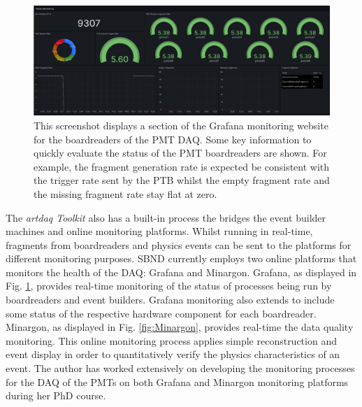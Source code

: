 \begin{figure}[htbp!] 
\centering    
\includegraphics[width=1.0\textwidth]{Grafana}
\caption[Grafana]{
This screenshot displays a section of the Grafana monitoring website for the boardreaders of the PMT DAQ.
Some key information to quickly evaluate the status of the PMT boardreaders are shown.
For example, the fragment generation rate is expected be consistent with the trigger rate sent by the PTB whilst the empty fragment rate and the missing fragment rate stay flat at zero.
}
\label{fig:Grafana}
 \end{figure}

The \textit{artdaq Toolkit} also has a built-in process the bridges the event builder machines and online monitoring platforms.
Whilst running in real-time, fragments from boardreaders and physics events can be sent to the platforms for different monitoring purposes.
SBND currently employs two online platforms that monitors the health of the DAQ: Grafana and Minargon.
Grafana, as displayed in Fig. \ref{fig:Grafana}, provides real-time monitoring of the status of processes being run by boardreaders and event builders. 
Grafana monitoring also extends to include some status of the respective hardware component for each boardreader.
Minargon, as displayed in Fig. \ref{fig:Minargon}, provides real-time the data quality monitoring. 
This online monitoring process applies simple reconstruction and event display in order to quantitatively verify the physics characteristics of an event. 
The author has worked extensively on developing the monitoring processes for the DAQ of the PMTs on both Grafana and Minargon monitoring platforms during her PhD course. 

